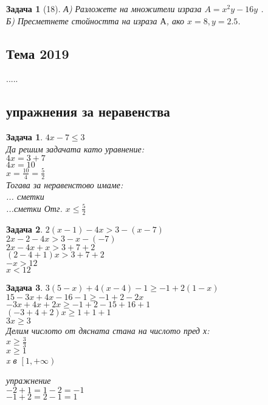 \documentclass{article}
\theoremstyle{plain}
\newtheorem*{problem*}{Задача}
\newtheorem{problem}{Задача}
\begin{document}
\begin{problem*}[18]
	А) Разложете на множители израза $ A = x^2 y - 16y$  .\\
	Б) Пресметнете стойността на израза $А$, ако $x= 8 , y = 2.5$.
\end{problem*}

\subsection{Тема 2019}
.....



\subsection{упражнения за неравенства}

\begin{problem}
	$4x - 7 \leq 3 $\\
	
	Да решим задачата като уравнение:\\	
	$4x = 3 +7 $ \\
	$4x = 10 $ \\
	$x = \frac{10}{4} = \frac{5}{2} $\\
	
	Тогава за неравенстово имаме:\\
	... сметки\\
	...сметки
	Отг. $x\leq \frac{5}{2} $
	
\end{problem}

\begin{problem}
	$2(x-1) -4x > 3 - (x-7)$\\
	$2x - 2 - 4x > 3 -x -(-7) $\\
	$ 2x - 4x +x > 3 +7 +2 $\\
	$(2-4+1)x > 3+7+2$\\
	$ -x > 12$\\
	$ x < 12 $
	
\end{problem}

\begin{problem}
	$3(5-x) + 4(x-4) - 1 \geq -1 + 2(1-x)$\\
	$15 -3x + 4x - 16 -1 \geq -1 +2 - 2x  $\\
	$-3x +4x +2x \geq -1 + 2 - 15 +16 + 1 $\\
	$(-3+4+2)x \geq 1 +1 + 1 $\\
	$ 3x \geq 3  $\\
	Делим числото от дясната стана на числото пред х:\\	
	$ x \geq \frac{3}{3} $\\
	$x \geq 1 $\\
	x  в $\left[ 1, +\infty \right) $
	
	
	
упражнение\\
$-2+1 = 1-2 = -1 $\\
$-1 +2 =2 -1 = 1 $\\

	
	
	
\end{problem}
\end{document}
